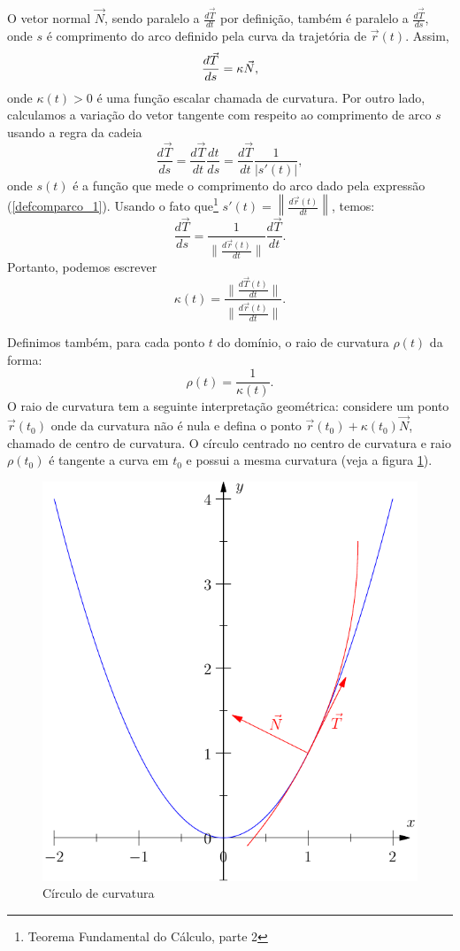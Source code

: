 O vetor normal $\vec{N}$,  sendo paralelo a $\frac{d\vec{T}}{dt}$ por definição, também é paralelo a $\frac{d\vec{T}}{ds}$, onde $s$ é comprimento do arco definido pela curva da trajetória de $\vec{r}(t)$. Assim, 
\begin{equation}{\label{Frenet_1}}
\frac{d \vec{T} }{ds}=\kappa   \vec{N},
\end{equation}
onde $\kappa(t)>0$ é uma função escalar chamada de curvatura. Por outro lado, calculamos a variação do vetor tangente com respeito ao comprimento de arco $s$ usando a regra da cadeia
$$
\frac{d \vec{T} }{ds}=\frac{d \vec{T} }{dt}\frac{dt}{ds}=\frac{d \vec{T} }{dt}\frac{1}{|s'(t)|},
$$
onde $s(t)$ é a função que mede o comprimento do arco dado pela expressão (\ref{defcomparco_1}). Usando o fato que\footnote{Teorema Fundamental do Cálculo, parte 2} $s'(t)=\left\|\frac{d\vec{r}(t)}{dt}\right\|$, temos:
$$
\frac{d \vec{T} }{ds}=\frac{1}{\|\frac{d\vec{r}(t)}{dt} \|}\frac{d \vec{T} }{dt}.
$$
Portanto, podemos escrever
$$
\kappa(t)=\frac{\|\frac{d\vec{T}(t)}{dt}\|}{\|\frac{d\vec{r}(t)}{dt}\|}.
$$

Definimos também, para cada ponto $t$ do domínio, o raio de curvatura $\rho(t)$ da forma:
$$
\rho(t)=\frac{1}{\kappa(t)}.
$$
O raio de curvatura tem a seguinte interpretação geométrica: considere um ponto $\vec{r}(t_0)$ onde da curvatura não é nula e defina o ponto $\vec{r}(t_0)+\kappa(t_0)\vec{N}$, chamado de centro de curvatura. O círculo centrado no centro de curvatura e raio $\rho(t_0)$ é tangente a curva em $t_0$ e possui a mesma curvatura (veja a figura \ref{raio_de_curvatura}).


\begin{figure}
\begin{center}
    \includegraphics{./cap_curvas/figs/circulo_curvatura_parabola}
 \caption{Círculo de curvatura}\label{raio_de_curvatura}
  \end{center}
\end{figure}


